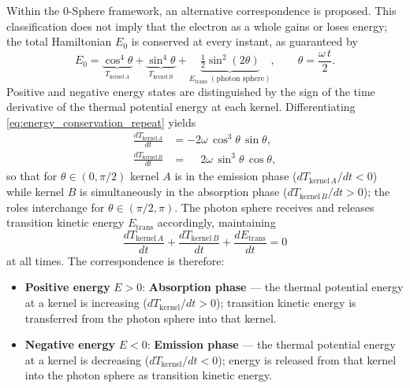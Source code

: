 \documentclass[12pt,letterpaper]{article}
\begin{document}
Within the 0-Sphere framework, an alternative correspondence is proposed. This classification does not imply that the electron as a whole gains or loses energy; the total Hamiltonian $E_0$ is conserved at every instant, as guaranteed by
\begin{equation}
  E_0 = \underbrace{\cos^4\!\theta}_{T_{\mathrm{kernel}\,A}} + \underbrace{\sin^4\!\theta}_{T_{\mathrm{kernel}\,B}} + \underbrace{\tfrac{1}{2}\sin^2\!(2\theta)}_{E_{\mathrm{trans}}\;(\text{photon sphere})}, \qquad \theta = \frac{\omega\, t}{2}.
  \label{eq:energy_conservation_repeat}
\end{equation}
Positive and negative energy states are distinguished by the sign of the time derivative of the thermal potential energy at each kernel. Differentiating \eqref{eq:energy_conservation_repeat} yields
\begin{align*}
  \frac{dT_{\mathrm{kernel}\,A}}{dt} &= -2\omega\,\cos^3\!\theta\,\sin\theta, \\
  \frac{dT_{\mathrm{kernel}\,B}}{dt} &= \phantom{-}2\omega\,\sin^3\!\theta\,\cos\theta,
\end{align*}
so that for $\theta\in(0,\pi/2)$ kernel $A$ is in the emission phase ($dT_{\mathrm{kernel}\,A}/dt < 0$) while kernel $B$ is simultaneously in the absorption phase ($dT_{\mathrm{kernel}\,B}/dt > 0$); the roles interchange for $\theta\in(\pi/2,\pi)$. The photon sphere receives and releases transition kinetic energy $E_{\mathrm{trans}}$ accordingly, maintaining
\[
  \frac{dT_{\mathrm{kernel}\,A}}{dt} + \frac{dT_{\mathrm{kernel}\,B}}{dt} + \frac{dE_{\mathrm{trans}}}{dt} = 0
\]
at all times. The correspondence is therefore:
\begin{itemize}
\item \textbf{Positive energy} $E > 0$: \textbf{Absorption phase} --- the thermal potential energy at a kernel is increasing ($dT_{\mathrm{kernel}}/dt > 0$); transition kinetic energy is transferred from the photon sphere into that kernel.
\item \textbf{Negative energy} $E < 0$: \textbf{Emission phase} --- the thermal potential energy at a kernel is decreasing ($dT_{\mathrm{kernel}}/dt < 0$); energy is released from that kernel into the photon sphere as transition kinetic energy.
\end{itemize}
\end{document}
